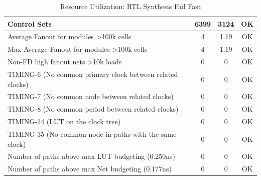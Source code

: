 \documentclass{article}
\begin{document}
\begin{table}[H]
{\begin{tabular}{|l|c|c|c|}
    Control Sets                                                      & 6399               & 3124                 & OK              \\ \hline
    Average Fanout for modules \textgreater 100k cells               & 4                  & 1.19                 & OK              \\ \hline
    Max Average Fanout for modules \textgreater 100k cells           & 4                  & 1.19                 & OK              \\ \hline
    Non-FD high fanout nets \textgreater 10k loads                   & 0                  & 0                    & OK              \\ \hline
    TIMING-6 (No common primary clock between related clocks)         & 0                  & 0                    & OK              \\ \hline
    TIMING-7 (No common node between related clocks)                  & 0                  & 0                    & OK              \\ \hline
    TIMING-8 (No common period between related clocks)                & 0                  & 0                    & OK              \\ \hline
    TIMING-14 (LUT on the clock tree)                                 & 0                  & 0                    & OK              \\ \hline
    TIMING-35 (No common node in paths with the same clock)           & 0                  & 0                    & OK              \\ \hline
    Number of paths above max LUT budgeting (0.250ns)                 & 0                  & 0                    & OK              \\ \hline
    Number of paths above max Net budgeting (0.177ns)                 & 0                  & 0                    & OK              \\ \hline
    \end{tabular}
    }
    \caption{Resource Utilization: RTL Synthesis Fail Fast}
\end{table}

    
\end{document}
